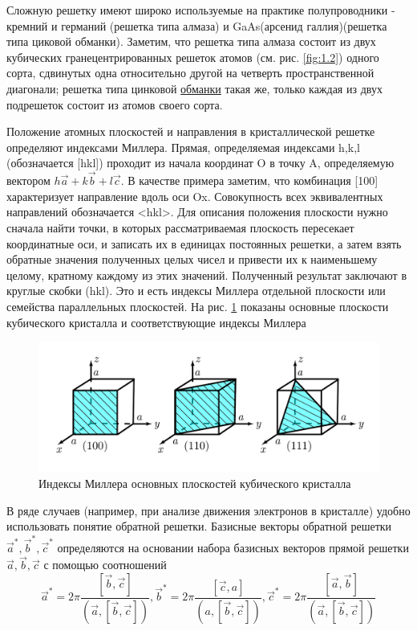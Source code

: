 Сложную решетку имеют широко используемые на практике полупроводники - кремний и германий (решетка типа алмаза) и
GaAs(арсенид галлия)(решетка типа циковой обманки). Заметим, что решетка типа алмаза состоит из двух кубических
гранецентрированных решеток атомов (см. рис. \ref{fig:1.2}) одного сорта, сдвинутых одна относительно другой на четверть
пространственной диагонали; решетка типа цинковой
\href{https://ru.wikipedia.org/wiki/%D0%9E%D0%B1%D0%BC%D0%B0%D0%BD%D0%BA%D0%B8}{обманки} такая же, только каждая из двух
подрешеток состоит из атомов своего сорта.

Положение атомных плоскостей и направления в кристаллической решетке определяют индексами Миллера. Прямая, определяемая
индексами h,k,l (обозначается [hkl]) проходит из начала координат O в точку A, определяемую вектором $h \vec{a} + k
\vec{b} + l \vec{c}$. В качестве примера заметим, что комбинация [100] характеризует направление вдоль оси Ox.
Совокупность всех эквивалентных направлений обозначается <hkl>. Для описания положения плоскости нужно сначала найти точки, в которых рассматриваемая
плоскость пересекает координатные оси, и записать их в единицах постоянных решетки, а затем взять обратные значения
полученных целых чисел и привести их к наименьшему целому, кратному каждому из этих значений. Полученный результат
заключают в круглые скобки (hkl). Это и есть индексы Миллера отдельной плоскости или семейства параллельных плоскостей.
На рис. \ref{fig:1.3} показаны основные плоскости кубического кристалла и соответствующие индексы Миллера

\begin{figure}[h!]
	\centering
	\includegraphics[width = .8\linewidth]{img/13}
	\caption{Индексы Миллера основных плоскостей кубического кристалла}
	\label{fig:1.3}
\end{figure}

В ряде случаев (например, при анализе движения электронов в кристалле) удобно использовать понятие обратной решетки.
Базисные векторы обратной решетки $\vec{a}^*,\vec{b}^*,\vec{c}^*$ определяются на основании набора базисных векторов
прямой решетки $\vec{a},\vec{b},\vec{c}$ с помощью соотношений
\begin{equation}
	\vec{a}^{*}=2 \pi \frac{[\vec{b}, \vec{c}]}{(\vec{a}, [ \vec{b}, \vec{c}])}, \vec{b}^{*}=2 \pi \frac{[\vec{c}, a]}{(a,[\vec{b}, \vec{c}])}, \vec{c}^{*}=2 \pi \frac{[\vec{a}, \vec{b}]}{(\vec{a},[\vec{b}, \vec{c}])}
	\label{eq:1.2}
\end{equation}

